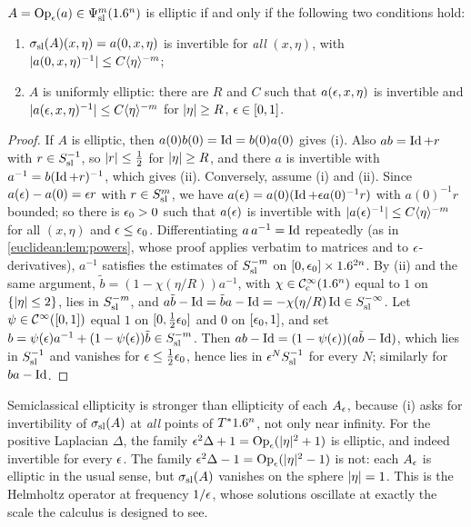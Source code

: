 \begin{lemma}\label{semiclassical:lem:elliptic}
  $A=\operatorname{Op}_\epsilon(a)\in\Psi^{m}_{\mathrm{sl}}(1.6^n)$ is elliptic if and only if the following two
  conditions hold:
  \begin{enumerate}[label=\textup{(\roman*)}]
  \item $\sigma_{\mathrm{sl}}(A)(x,\eta)=a(0,x,\eta)$ is invertible for \emph{all} $(x,\eta)$, with
    $\lvert a(0,x,\eta)^{-1}\rvert\le C\langle \eta\rangle^{-m}$;
  \item $A$ is uniformly elliptic: there are $R$ and $C$ such that $a(\epsilon,x,\eta)$
    is invertible and $\lvert a(\epsilon,x,\eta)^{-1}\rvert\le C\langle \eta\rangle^{-m}$ for $\lvert \eta\rvert\ge R$,
    $\epsilon\in[0,1]$.
  \end{enumerate}
\end{lemma}
\begin{proof}
  If $A$ is elliptic, then $a(0)b(0)=\operatorname{Id}=b(0)a(0)$ gives (i). Also
  $ab=\operatorname{Id}+r$ with $r\in S^{-1}_{\mathrm{sl}}$, so $\lvert r\rvert\le\frac12$ for $\lvert \eta\rvert\ge R$, and
  there $a$ is invertible with $a^{-1}=b(\operatorname{Id}+r)^{-1}$, which gives (ii).
  Conversely, assume (i) and (ii). Since $a(\epsilon)-a(0)=\epsilon r$ with $r\in S^{m}_{\mathrm{sl}}$, we have
  $a(\epsilon)=a(0)(\operatorname{Id}+\epsilon a(0)^{-1}r)$ with $a(0)^{-1}r$ bounded; so there is
  $\epsilon_0>0$ such that $a(\epsilon)$ is invertible with $\lvert a(\epsilon)^{-1}\rvert\le C\langle \eta\rangle^{-m}$
  for all $(x,\eta)$ and $\epsilon\le\epsilon_0$. Differentiating $a\,a^{-1}=\operatorname{Id}$ repeatedly
  (as in \cref{euclidean:lem:powers}, whose proof applies verbatim to matrices and
  to $\epsilon$-derivatives), $a^{-1}$ satisfies the estimates of $S^{-m}_{\mathrm{sl}}$ on
  $[0,\epsilon_0]\times1.6^{2n}$. By (ii) and the same argument,
  $\tilde b=(1-\chi(\eta/R))a^{-1}$, with $\chi\in\mathcal{C}^\infty_{\mathrm{c}}(1.6^n)$ equal to $1$ on
  $\{\lvert \eta\rvert\le2\}$, lies in $S^{-m}_{\mathrm{sl}}$, and $a\tilde b-\operatorname{Id}=\tilde ba-\operatorname{Id}=-\chi(\eta/R)\operatorname{Id}\in S^{-\infty}_{\mathrm{sl}}$. Let $\psi\in\mathcal{C}^\infty([0,1])$
  equal $1$ on $[0,\frac12\epsilon_0]$ and $0$ on $[\epsilon_0,1]$, and set
  $b=\psi(\epsilon)a^{-1}+(1-\psi(\epsilon))\tilde b\in S^{-m}_{\mathrm{sl}}$. Then
  $ab-\operatorname{Id}=(1-\psi(\epsilon))(a\tilde b-\operatorname{Id})$, which lies in $S^{-1}_{\mathrm{sl}}$ and vanishes for
  $\epsilon\le\frac12\epsilon_0$, hence lies in $\epsilon^NS^{-1}_{\mathrm{sl}}$ for every $N$; similarly
  for $ba-\operatorname{Id}$.
\end{proof}

\begin{discussion}
Semiclassical ellipticity is stronger than ellipticity of each $A_\epsilon$,
because (i) asks for invertibility of $\sigma_{\mathrm{sl}}(A)$ at \emph{all} points of
$T^*1.6^n$, not only near infinity. For the positive Laplacian $\Delta$, the
family $\epsilon^2\Delta+1=\operatorname{Op}_\epsilon(\lvert \eta\rvert^2+1)$ is elliptic, and indeed
invertible for every $\epsilon$. The family $\epsilon^2\Delta-1=\operatorname{Op}_\epsilon(\lvert \eta\rvert^2-1)$
is not: each $A_\epsilon$ is elliptic in the usual sense, but $\sigma_{\mathrm{sl}}(A)$ vanishes on
the sphere $\lvert \eta\rvert=1$. This is the Helmholtz operator at frequency $1/\epsilon$,
whose solutions oscillate at exactly the scale the calculus is designed to see.
\end{discussion}

